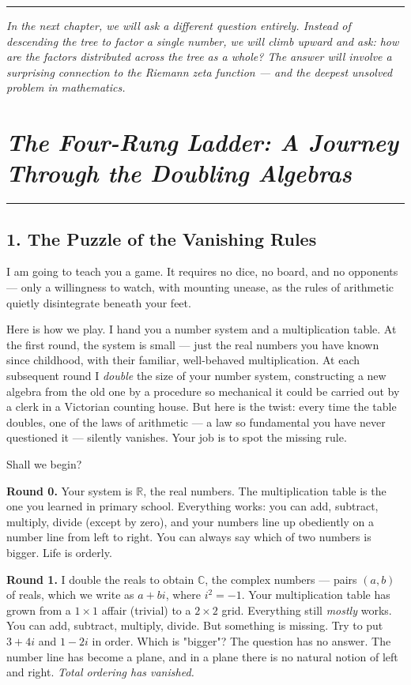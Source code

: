 \documentclass[11pt,openany]{book}
\theoremstyle{definition}
\theoremstyle{plain}
\theoremstyle{remark}
\begin{document}
\bigskip\noindent\rule{\textwidth}{0.4pt}\bigskip


\textit{In the next chapter, we will ask a different question entirely. Instead of descending the tree to factor a single number, we will climb upward and ask: how are the factors distributed across the tree as a whole? The answer will involve a surprising connection to the Riemann zeta function — and the deepest unsolved problem in mathematics.}

\clearpage

\chapter{\textit{The Four-Rung Ladder: A Journey Through the Doubling Algebras}}



\bigskip\noindent\rule{\textwidth}{0.4pt}\bigskip


\section{1. The Puzzle of the Vanishing Rules}


I am going to teach you a game. It requires no dice, no board, and no opponents — only a willingness to watch, with mounting unease, as the rules of arithmetic quietly disintegrate beneath your feet.

Here is how we play. I hand you a number system and a multiplication table. At the first round, the system is small — just the real numbers you have known since childhood, with their familiar, well-behaved multiplication. At each subsequent round I \textit{double} the size of your number system, constructing a new algebra from the old one by a procedure so mechanical it could be carried out by a clerk in a Victorian counting house. But here is the twist: every time the table doubles, one of the laws of arithmetic — a law so fundamental you have never questioned it — silently vanishes. Your job is to spot the missing rule.

Shall we begin?

\textbf{Round 0.} Your system is $\mathbb{R}$, the real numbers. The multiplication table is the one you learned in primary school. Everything works: you can add, subtract, multiply, divide (except by zero), and your numbers line up obediently on a number line from left to right. You can always say which of two numbers is bigger. Life is orderly.

\textbf{Round 1.} I double the reals to obtain $\mathbb{C}$, the complex numbers — pairs $(a, b)$ of reals, which we write as $a + bi$, where $i^2 = -1$. Your multiplication table has grown from a $1 \times 1$ affair (trivial) to a $2 \times 2$ grid. Everything still \textit{mostly} works. You can add, subtract, multiply, divide. But something is missing. Try to put $3 + 4i$ and $1 - 2i$ in order. Which is "bigger"? The question has no answer. The number line has become a plane, and in a plane there is no natural notion of left and right. \textit{Total ordering has vanished.}
\end{document}

